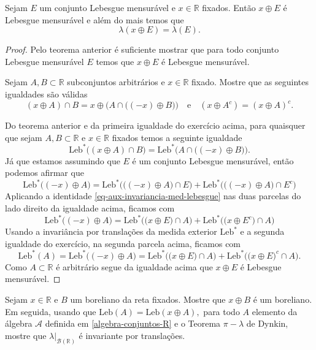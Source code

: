 \begin{teorema}
Sejam $E$ um conjunto Lebesgue mensurável e $x\in\mathbb{R}$
fixados. Então $x\oplus E$ é Lebesgue mensurável e além do 
mais temos que 
\[
\lambda(x\oplus E)= \lambda(E).
\]
\end{teorema}

\begin{proof}
Pelo teorema anterior é suficiente mostrar que 
para todo conjunto Lebesgue mensurável $E$ temos 
que $x\oplus E$ é Lebesgue mensurável.
\begin{exercicio}
Sejam $A,B\subset \mathbb{R}$ subconjuntos arbitrários
e $x\in\mathbb{R}$ fixado. Mostre que as seguintes igualdades
são válidas
\[
(x\oplus A)\cap B 
= 
x\oplus 
\Big(A\cap \big((-x)\oplus B\big)\Big)
\quad\text{e}\quad
(x\oplus A^c) = (x\oplus A)^c.
\]
\end{exercicio}
Do teorema anterior e da primeira igualdade do exercício 
acima, para quaisquer que sejam $A,B\subset \mathbb{R}$ 
e $x\in\mathbb{R}$ fixados temos a seguinte igualdade  
\begin{equation}\label{eq-aux-invariancia-med-lebesgue}
\mathrm{Leb}^*\big((x\oplus A)\cap B\big)
= 
\mathrm{Leb}^*
\Big(A\cap \big((-x)\oplus B\big)\Big).
\end{equation}
Já que estamos assumindo que $E$ 
é um conjunto Lebesgue mensurável, então 
podemos afirmar que 
\[
\mathrm{Leb}^*\big((-x)\oplus A\big)
=
\mathrm{Leb}^*\Big( \big((-x)\oplus A\big) \cap E\Big)
+
\mathrm{Leb}^*\Big( \big((-x)\oplus A\big) \cap E^c\Big)
\]
Aplicando a identidade 
\eqref{eq-aux-invariancia-med-lebesgue} nas duas parcelas
do lado direito da igualdade acima, ficamos com 
\[
\mathrm{Leb}^*\big((-x)\oplus A\big)
=
\mathrm{Leb}^*\Big( \big(x\oplus E\big) \cap A\Big)
+
\mathrm{Leb}^*\Big( \big(x\oplus E^c\big) \cap A\Big)
\]
Usando a invariância por translações da medida exterior 
$\mathrm{Leb}^*$ e a segunda igualdade do exercício,
na segunda parcela acima, ficamos com 
\[
\mathrm{Leb}^*(A)
=
\mathrm{Leb}^*\big((-x)\oplus A\big)
=
\mathrm{Leb}^*\Big( \big(x\oplus E\big) \cap A\Big)
+
\mathrm{Leb}^*\Big( \big(x\oplus E\big)^c \cap A\Big).
\]
Como $A\subset \mathbb{R}$ é arbitrário segue da igualdade acima que 
$x\oplus E$ é Lebesgue mensurável.
\end{proof}







\begin{exercicio}
Sejam $x\in\mathbb{R}$ e $B$ um boreliano da reta fixados.
Mostre que $x\oplus B$ é um boreliano.
Em seguida, usando que 
$
	\mathrm{Leb}(A)=\mathrm{Leb}(x\oplus A),
$
para todo $A$ elemento da 
álgebra $\mathcal{A}$ definida em \eqref{algebra-conjuntos-R}
e o Teorema $\pi-\lambda$ de Dynkin,
mostre que $\lambda\big|_{\mathscr{B}(\mathbb{R})}$
é invariante por translações. 

\end{exercicio}